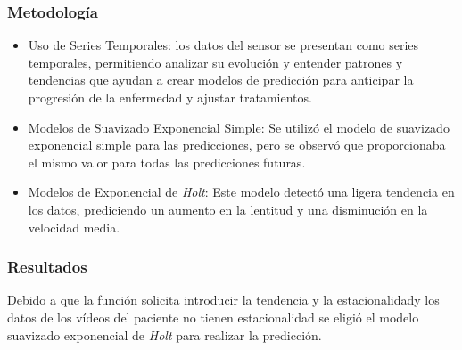 \subsubsection{Metodología}
\begin{itemize}
\item  Uso de Series Temporales: los datos del sensor se presentan como series temporales, permitiendo analizar su evolución y entender patrones y tendencias que ayudan a crear modelos de predicción para anticipar la progresión de la enfermedad y ajustar tratamientos.
\item Modelos de Suavizado Exponencial Simple: Se utilizó el modelo de suavizado exponencial simple para las predicciones, pero se observó que proporcionaba el mismo valor para todas las predicciones futuras.
\item Modelos de Exponencial de \textit{Holt}: Este modelo detectó una ligera tendencia en los datos, prediciendo un aumento en la lentitud y una disminución en la velocidad media.
\end{itemize}

\subsubsection{Resultados}

Debido a que la función solicita introducir la tendencia y la estacionalidady los datos de los vídeos del paciente no tienen estacionalidad se eligió el modelo suavizado exponencial de \textit{Holt} para realizar la predicción.